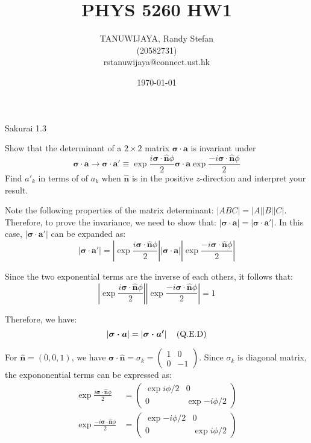 \documentclass{article}
\title{PHYS 5260 HW1}
\author{TANUWIJAYA, Randy Stefan \\ (20582731) \\ rstanuwijaya@connect.ust.hk}
\affil{Department of Physics - HKUST}
\date{\today}
\begin{document}
	\maketitle
	\begin{section}{Sakurai 1.3}
		\newcommand{\nhat}{\boldsymbol{\hat{n}}}
		\newcommand{\sigdotn}{\boldsymbol{\sigma \cdot \hat{n}}}

		Show that the determinant of a $2 \times 2$ matrix $\boldsymbol{\sigma \cdot a}$ is invariant under
		\begin{equation*}
			\boldsymbol{\sigma \cdot a} \rightarrow \boldsymbol{\sigma \cdot a'} \equiv 
				\exp{{\frac{i \sigdotn \phi}{2}}} 
				\boldsymbol{\sigma \cdot a}
				\exp{{\frac{-i \sigdotn \phi}{2}}}
		\end{equation*}
		Find $a'_k$ in terms of of $a_k$ when $\nhat$ is in the positive $z$-direction and interpret your result.
		\begin{tcolorbox}[breakable]
			Note the following properties of the matrix determinant: $|ABC| = |A||B||C|$. Therefore, to prove the invariance, we need to show that: $\left|\boldsymbol{\sigma \cdot a}\right| = \left|\boldsymbol{\sigma \cdot a'}\right|$. In this case, $\left|\boldsymbol{\sigma \cdot a'}\right|$ can be expanded as:
		\begin{equation*}
			\left|\boldsymbol{\sigma \cdot a'}\right| =
			\left|
				\exp{{\frac{i \sigdotn \phi}{2}}} 
			\right|
			\left|
				\boldsymbol{\sigma \cdot a}
			\right|
			\left|
				\exp{{\frac{-i \sigdotn \phi}{2}}}
			\right|
		\end{equation*}

		Since the two exponential terms are the inverse of each others, it follows that: 
		\begin{equation*}
			\left|
				\exp{{\frac{i \sigdotn \phi}{2}}} 
			\right|
			\left|
				\exp{{\frac{-i \sigdotn \phi}{2}}}
			\right|
			= 1
		\end{equation*}

		Therefore, we have:
		\begin{equation*}
			\left|\boldsymbol{\sigma \cdot a}\right| =
			\left|
				\boldsymbol{\sigma \cdot a'}
			\right| \qed
		\end{equation*}

		For $\nhat = (0,0,1)$, we have $\sigdotn = \sigma_k = \begin{pmatrix}1 & 0 \\ 0 & -1 \end{pmatrix}$. 
		Since $\sigma_k$ is diagonal matrix, the expononential terms can be expressed as:
		\begin{align*}
			\exp{{\frac{i \sigdotn \phi}{2}}} &= 
			\begin{pmatrix}
				\exp{i \phi / 2} & 0 \\
				0 & \exp{-i \phi / 2}
			\end{pmatrix} \\
			\exp{{\frac{-i \sigdotn \phi}{2}}} &= 
			\begin{pmatrix}
				\exp{-i \phi / 2} & 0 \\
				0 & \exp{i \phi / 2}
			\end{pmatrix} \\
		\end{align*}


\end{tcolorbox}
\end{section}
\end{document}
